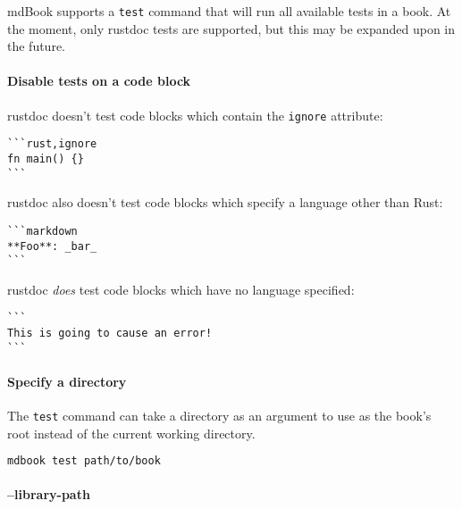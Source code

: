 \documentclass{article}
\begin{document}
mdBook supports a \lstinline|test| command that will run all available tests in a book. At
the moment, only rustdoc tests are supported, but this may be expanded upon in
the future.\\

\paragraph{Disable tests on a code block}
\label{Disable tests on a code block}
\label{disable-tests-on-a-code-block}

rustdoc doesn't test code blocks which contain the \lstinline|ignore| attribute:\\
\begin{lstlisting}
```rust,ignore
fn main() {}
```

\end{lstlisting}

rustdoc also doesn't test code blocks which specify a language other than Rust:\\
\begin{lstlisting}
```markdown
**Foo**: _bar_
```

\end{lstlisting}

rustdoc \emph{does} test code blocks which have no language specified:\\
\begin{lstlisting}
```
This is going to cause an error!
```

\end{lstlisting}

\paragraph{Specify a directory}
\label{Specify a directory}
\label{specify-a-directory}

The \lstinline|test| command can take a directory as an argument to use as the book's root
instead of the current working directory.\\
\begin{lstlisting}[language=bash]
mdbook test path/to/book

\end{lstlisting}

\paragraph{--library-path}
\label{--library-path}
\label{library-path}
\end{document}
